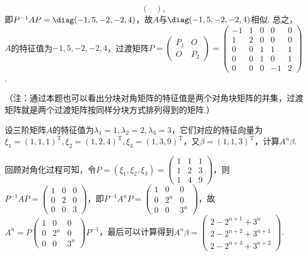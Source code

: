 \begin{exercise}
\begin{exgroup}
\begin{answer}
\[\begin{pmatrix}
            \end{pmatrix},\]
        即$P^{-1}AP=\diag(-1,5,-2,-2,4)$，故$A$与$\diag(-1,5,-2,-2,4)$相似. 总之，$A$的特征值为$-1,5,-2,-2,4$，过渡矩阵$P=\begin{pmatrix}
                P_1 & O \\ O & P_2
            \end{pmatrix}=\begin{pmatrix}
                -1 & 1 & 0 & 0 & 0 \\ 1 & 2 & 0 & 0 & 0 \\ 0 & 0 & 1 & 1 & 1 \\ 0 & 0 & 1 & 0 & 1 \\ 0 & 0 & 0 & -1 & 2
            \end{pmatrix}$.

        （注：通过本题也可以看出分块对角矩阵的特征值是两个对角块矩阵的并集，过渡矩阵就是两个过渡矩阵按同样分块方式排列得到的矩阵.）
        \end{answer}

        \item 设三阶矩阵$A$的特征值为$\lambda_1=1,\lambda_2=2,\lambda_3=3$，它们对应的特征向量为$\xi_1=(1,1,1)^\mathrm{T}, \xi_2=(1,2,4)^\mathrm{T},\xi_3=(1,3,9)^\mathrm{T}$，又$\beta=(1,1,3)^\mathrm{T}$，计算$A^n\beta$.
        \begin{answer}
            回顾对角化过程可知，令$P=(\xi_1,\xi_2,\xi_3)=\begin{pmatrix}
                1 & 1 & 1 \\ 1 & 2 & 3 \\ 1 & 4 & 9
            \end{pmatrix}$，则$P^{-1}AP=\begin{pmatrix}
                1 & 0 & 0 \\ 0 & 2 & 0 \\ 0 & 0 & 3
            \end{pmatrix}$，即$P^{-1}A^nP=\begin{pmatrix}
                1 & 0 & 0 \\ 0 & 2^n & 0 \\ 0 & 0 & 3^n
            \end{pmatrix}$，故$A^n=P\begin{pmatrix}
                1 & 0 & 0 \\ 0 & 2^n & 0 \\ 0 & 0 & 3^n
            \end{pmatrix}P^{-1}$，最后可以计算得到$A^n\beta=\begin{pmatrix}
                2-2^{n+1}+3^n \\ 2-2^{n+2}+3^{n+1} \\ 2-2^{n+3}+3^{n+2}
            \end{pmatrix}$.
        \end{answer}


\end{exgroup}
\end{exercise}
